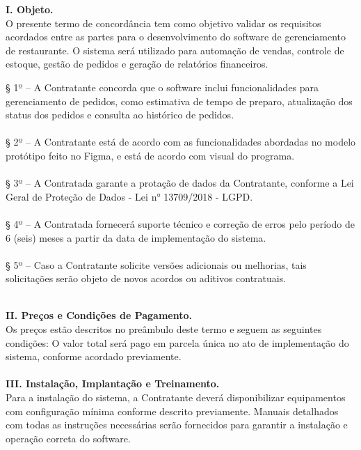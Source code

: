 \leftskip 0pt
\rightskip 0pt
\textbf{I. Objeto.}\\
O presente termo de concordância tem como objetivo validar os requisitos acordados entre as partes para o desenvolvimento do software de gerenciamento de restaurante. O sistema será utilizado para automação de vendas, controle de estoque, gestão de pedidos e geração de relatórios financeiros.\\

\begingroup

    \leftskip 20pt
    \rightskip 20pt
    
    § 1º – A Contratante concorda que o software inclui funcionalidades para gerenciamento de pedidos, como estimativa de tempo de preparo, atualização dos status dos pedidos e consulta ao histórico de pedidos.\\\\
    § 2º – A Contratante está de acordo com as funcionalidades abordadas no modelo protótipo feito no Figma, e está de acordo com visual do programa.\\\\
    § 3º – A Contratada garante a protação de dados da Contratante, conforme a Lei Geral de Proteção de Dados - Lei n° 13709/2018 - LGPD.\\\\
    § 4º – A Contratada fornecerá suporte técnico e correção de erros pelo período de 6 (seis) meses a partir da data de implementação do sistema.\\\\
    § 5º – Caso a Contratante solicite versões adicionais ou melhorias, tais solicitações serão objeto de novos acordos ou aditivos contratuais.\\\\
    
\endgroup

\textbf{II. Preços e Condições de Pagamento.}\\
Os preços estão descritos no preâmbulo deste termo e seguem as seguintes condições:
O valor total será pago em parcela única no ato de implementação do sistema, conforme acordado previamente.\\\\


\textbf{III. Instalação, Implantação e Treinamento.}\\
Para a instalação do sistema, a Contratante deverá disponibilizar equipamentos com configuração mínima conforme descrito previamente. Manuais detalhados com todas as instruções necessárias serão fornecidos para garantir a instalação e operação correta do software.

